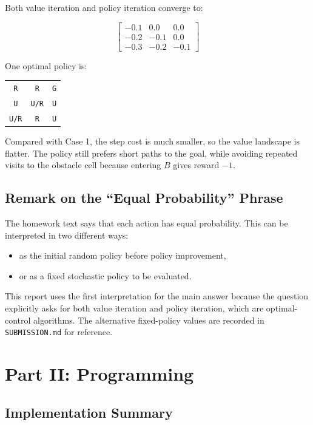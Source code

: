 \documentclass[11pt,a4paper]{article}
\begin{document}
Both value iteration and policy iteration converge to:

\[
\begin{bmatrix}
-0.1 & 0.0 & 0.0 \\
-0.2 & -0.1 & 0.0 \\
-0.3 & -0.2 & -0.1
\end{bmatrix}
\]

One optimal policy is:

\begin{center}
\begin{tabular}{ccc}
\texttt{R} & \texttt{R} & \texttt{G} \\
\texttt{U} & \texttt{U/R} & \texttt{U} \\
\texttt{U/R} & \texttt{R} & \texttt{U}
\end{tabular}
\end{center}

Compared with Case 1, the step cost is much smaller, so the value landscape is flatter. The policy still prefers short paths to the goal, while avoiding repeated visits to the obstacle cell because entering $B$ gives reward $-1$.

\subsection{Remark on the ``Equal Probability'' Phrase}

The homework text says that each action has equal probability. This can be interpreted in two different ways:

\begin{itemize}
    \item as the initial random policy before policy improvement,
    \item or as a fixed stochastic policy to be evaluated.
\end{itemize}

This report uses the first interpretation for the main answer because the question explicitly asks for both value iteration and policy iteration, which are optimal-control algorithms. The alternative fixed-policy values are recorded in \texttt{SUBMISSION.md} for reference.

\section{Part II: Programming}

\subsection{Implementation Summary}
\end{document}
